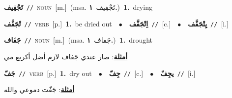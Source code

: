 \documentclass[10pt,a4paper,twoside]{article} %
\begin{document}
\begin{multicols}{2}
{\setlength\topsep{0pt}\textbf{\foreignlanguage{arabic}{تَجْفِيف}}\ {\color{gray}\texttt{//}\color{black}}\ \textsc{noun}\ [m.]\ \color{gray}(msa. \foreignlanguage{arabic}{تَجْفِيف}~\foreignlanguage{arabic}{\textbf{١.}})\color{black}\ \textbf{1.}~drying\ } \vspace{2mm}

{\setlength\topsep{0pt}\textbf{\foreignlanguage{arabic}{تْجَفَّف}}\ {\color{gray}\texttt{//}\color{black}}\ \textsc{verb}\ [p.]\ \textbf{1.}~be dried out\ \ $\bullet$\ \ \setlength\topsep{0pt}\textbf{\foreignlanguage{arabic}{اِتْجَفَّف}}\ {\color{gray}\texttt{//}\color{black}}\ [c.]\ \ $\bullet$\ \ \setlength\topsep{0pt}\textbf{\foreignlanguage{arabic}{يِتْجَفَّف}}\ {\color{gray}\texttt{//}\color{black}}\ [i.]\ } \vspace{2mm}

{\setlength\topsep{0pt}\textbf{\foreignlanguage{arabic}{جَفَاف}}\ {\color{gray}\texttt{//}\color{black}}\ \textsc{noun}\ [m.]\ \color{gray}(msa. \foreignlanguage{arabic}{جَفاف}~\foreignlanguage{arabic}{\textbf{١.}})\color{black}\ \textbf{1.}~drought\  \begin{flushright}\color{gray}\foreignlanguage{arabic}{\textbf{\underline{\foreignlanguage{arabic}{أمثلة}}}: صار عندي جَفاف لازم أضل أكربع مي}\end{flushright}\color{black}} \vspace{2mm}

{\setlength\topsep{0pt}\textbf{\foreignlanguage{arabic}{جَفّ}}\ {\color{gray}\texttt{//}\color{black}}\ \textsc{verb}\ [p.]\ \textbf{1.}~dry out\ \ $\bullet$\ \ \setlength\topsep{0pt}\textbf{\foreignlanguage{arabic}{جِفّ}}\ {\color{gray}\texttt{//}\color{black}}\ [c.]\ \ $\bullet$\ \ \setlength\topsep{0pt}\textbf{\foreignlanguage{arabic}{يجِفّ}}\ {\color{gray}\texttt{//}\color{black}}\ [i.]\  \begin{flushright}\color{gray}\foreignlanguage{arabic}{\textbf{\underline{\foreignlanguage{arabic}{أمثلة}}}: جَفّت دموعي والله}\end{flushright}\color{black}} \vspace{2mm}


\end{multicols}
\end{document}
